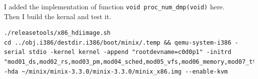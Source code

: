 \documentclass{article}
\begin{document}
I added the implementation of function \texttt{void proc_num_dmp(void)} here.\\

Then I build the kernal and test it.
\begin{verbatim}
./releasetools/x86_hdiimage.sh
cd ../obj.i386/destdir.i386/boot/minix/.temp && qemu-system-i386 -serial stdio -kernel kernel -append "rootdevname=c0d0p1" -initrd "mod01_ds,mod02_rs,mod03_pm,mod04_sched,mod05_vfs,mod06_memory,mod07_tty,mod08_mfs,mod09_vm,mod10_pfs,mod11_init" -hda ~/minix/minix-3.3.0/minix-3.3.0/minix_x86.img --enable-kvm
\end{verbatim}
\end{document}
